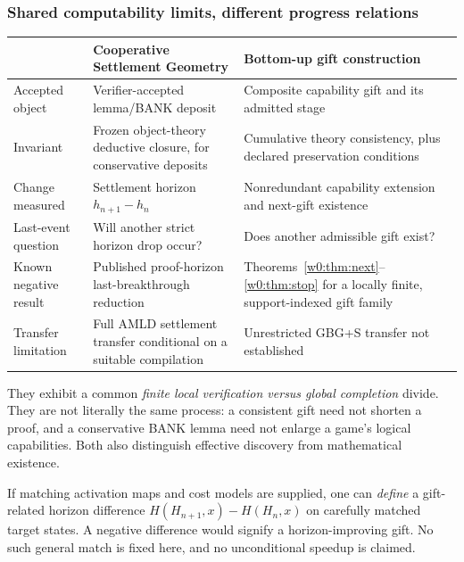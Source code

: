 \documentclass[11pt,letterpaper]{article}
\theoremstyle{definition}\newtheorem{definition}[theorem]{Definition}\newtheorem{example}[theorem]{Example}
\theoremstyle{remark}\newtheorem{remark}[theorem]{Remark}
\begin{document}
\subsubsection{Shared computability limits, different progress relations}
\begin{center}
\small
\begin{tabularx}{\textwidth}{@{}p{}X X@{}}
\toprule
&\textbf{Cooperative Settlement Geometry}&\textbf{Bottom-up gift construction}\\\midrule
Accepted object&Verifier-accepted lemma/BANK deposit&Composite capability gift and its admitted stage\\
Invariant&Frozen object-theory deductive closure, for conservative deposits&Cumulative theory consistency, plus declared preservation conditions\\
Change measured&Settlement horizon $h_{n+1}-h_n$&Nonredundant capability extension and next-gift existence\\
Last-event question&Will another strict horizon drop occur?&Does another admissible gift exist?\\
Known negative result&Published proof-horizon last-breakthrough reduction&Theorems~\ref{w0:thm:next}--\ref{w0:thm:stop} for a locally finite, support-indexed gift family\\
Transfer limitation&Full AMLD settlement transfer conditional on a suitable compilation&Unrestricted GBG+S transfer not established\\
\bottomrule
\end{tabularx}
\end{center}

They exhibit a common \emph{finite local verification versus global completion} divide. They are not literally the same process: a consistent gift need not shorten a proof, and a conservative BANK lemma need not enlarge a game's logical capabilities. Both also distinguish effective discovery from mathematical existence.

If matching activation maps and cost models are supplied, one can \emph{define} a gift-related horizon difference $H(H_{n+1},x)-H(H_n,x)$ on carefully matched target states. A negative difference would signify a horizon-improving gift. No such general match is fixed here, and no unconditional speedup is claimed.
\end{document}
